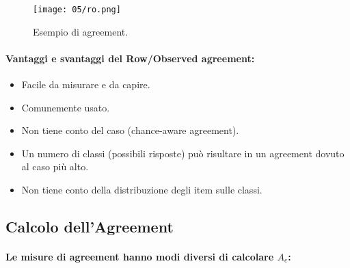 \begin{figure}[h]
    \centering
    \texttt{[image: 05/ro.png]}
    \caption{Esempio di agreement.}
    \label{fig:ag}
\end{figure}

\paragraph{Vantaggi e svantaggi del Row/Observed agreement:}

\begin{itemize}
  \item [\textcolor{green}{\ding{51}}] Facile da misurare e da capire. 
 \item [\textcolor{green}{\ding{51}}] Comunemente usato.
       \item [\textcolor{red}{\ding{55}}] Non tiene conto del caso (chance-aware agreement). 
          \item [\textcolor{red}{\ding{55}}] Un numero di classi (possibili risposte) può risultare in un agreement dovuto al caso più alto. 

             \item [\textcolor{red}{\ding{55}}] Non tiene conto della distribuzione degli item sulle classi. 
\end{itemize}

\subsection{Calcolo dell'Agreement}


\paragraph{Le misure di agreement hanno modi diversi di calcolare $A_e$:}

